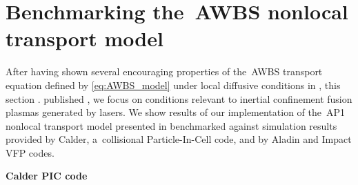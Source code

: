 \section{Benchmarking the~AWBS nonlocal transport model}
\label{sec:BenchmarkingAWBS}
After having shown several encouraging properties of the~AWBS transport 
equation defined by \eqref{eq:AWBS_model} under local diffusive conditions
in , this section 
\cite{Malone_1975_15, Colombant_PoP2005, Bell_1981_83, LMV_1983_7, Brantov_Nonlocal_electron_transport_1998, schurtz2000, Sorbo_2015}.
 published 
\cite{Epperlein_PoFB1991, marocchino2013, Sorbo_2015, 
Sorbo_2016, Sherlock_PoP2017, Brodrick_PoP2017}, we focus on 
conditions relevant to inertial confinement fusion plasmas generated by lasers.
We show results of our implementation of the~AP1 nonlocal transport model 
presented in  benchmarked against simulation results
provided by Calder, a~collisional Particle-In-Cell
code, and by Aladin and Impact \cite{Kingham_JCP2004} VFP codes. 



\textbf{Calder PIC code}

